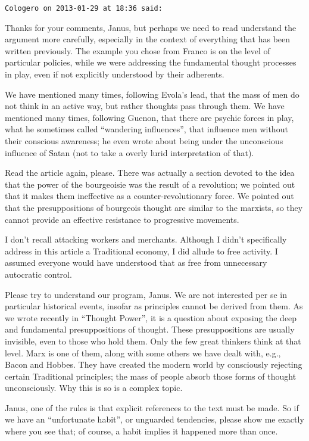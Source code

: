 \begin{footnotesize}
\begin{sffamily}
\hfill

\texttt{Cologero on 2013-01-29 at 18:36 said:}

Thanks for your comments, Janus, but perhaps we need to read understand the argument more carefully, especially in the context of everything that has been written previously. The example you chose from Franco is on the level of particular policies, while we were addressing the fundamental thought processes in play, even if not explicitly understood by their adherents.

We have mentioned many times, following Evola's lead, that the mass of men do not think in an active way, but rather thoughts pass through them. We have mentioned many times, following Guenon, that there are psychic forces in play, what he sometimes called ``wandering influences'', that influence men without their conscious awareness; he even wrote about being under the unconscious influence of Satan (not to take a overly lurid interpretation of that).

Read the article again, please. There was actually a section devoted to the idea that the power of the bourgeoisie was the result of a revolution; we pointed out that it makes them ineffective as a counter-revolutionary force. We pointed out that the presuppositions of bourgeois thought are similar to the marxists, so they cannot provide an effective resistance to progressive movements.

I don't recall attacking workers and merchants. Although I didn't specifically address in this article a Traditional economy, I did allude to free activity. I assumed everyone would have understood that as free from unnecessary autocratic control.

Please try to understand our program, Janus. We are not interested per se in particular historical events, insofar as principles cannot be derived from them. As we wrote recently in ``Thought Power'', it is a question about exposing the deep and fundamental presuppositions of thought. These presuppositions are usually invisible, even to those who hold them. Only the few great thinkers think at that level. Marx is one of them, along with some others we have dealt with, e.g., Bacon and Hobbes. They have created the modern world by consciously rejecting certain Traditional principles; the mass of people absorb those forms of thought unconsciously. Why this is so is a complex topic.

Janus, one of the rules is that explicit references to the text must be made. So if we have an ``unfortunate habit'', or unguarded tendencies, please show me exactly where you see that; of course, a habit implies it happened more than once.


\end{sffamily}
\end{footnotesize}
